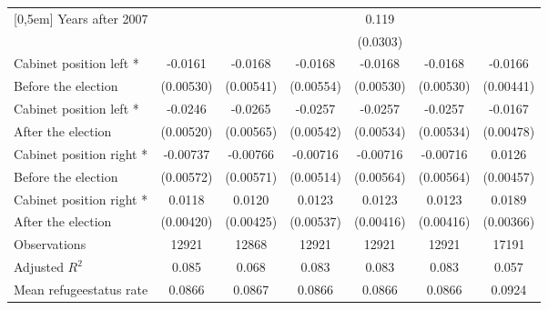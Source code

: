 \begin{table}[!ht]
\begin{tabular}{l*{6}{c}}
[0,5em]
Years after 2007    &                     &                     &                     &       0.119\sym{***}&                     &                     \\
                    &                     &                     &                     &    (0.0303)         &                     &                     \\
[0,5em]
Cabinet position left * &     -0.0161\sym{**} &     -0.0168\sym{**} &     -0.0168\sym{**} &     -0.0168\sym{**} &     -0.0168\sym{**} &     -0.0166\sym{***}\\
Before the election                    &   (0.00530)         &   (0.00541)         &   (0.00554)         &   (0.00530)         &   (0.00530)         &   (0.00441)         \\
[0,5em]
Cabinet position left * &     -0.0246\sym{***}&     -0.0265\sym{***}&     -0.0257\sym{***}&     -0.0257\sym{***}&     -0.0257\sym{***}&     -0.0167\sym{**} \\
After the election                    &   (0.00520)         &   (0.00565)         &   (0.00542)         &   (0.00534)         &   (0.00534)         &   (0.00478)         \\
[0,5em]
Cabinet position right * &    -0.00737         &    -0.00766         &    -0.00716         &    -0.00716         &    -0.00716         &      0.0126\sym{**} \\
Before the election                    &   (0.00572)         &   (0.00571)         &   (0.00514)         &   (0.00564)         &   (0.00564)         &   (0.00457)         \\
[0,5em]
Cabinet position right * &      0.0118\sym{**} &      0.0120\sym{**} &      0.0123\sym{*}  &      0.0123\sym{**} &      0.0123\sym{**} &      0.0189\sym{***}\\
After the election                    &   (0.00420)         &   (0.00425)         &   (0.00537)         &   (0.00416)         &   (0.00416)         &   (0.00366)         \\
\hline
Observations        &       12921         &       12868         &       12921         &       12921         &       12921         &       17191         \\
Adjusted \(R^{2}\)  &       0.085         &       0.068         &       0.083         &       0.083         &       0.083         &       0.057         \\
Mean refugeestatus rate&      0.0866         &      0.0867         &      0.0866         &      0.0866         &      0.0866         &      0.0924         \\

\end{tabular}
\end{table}
